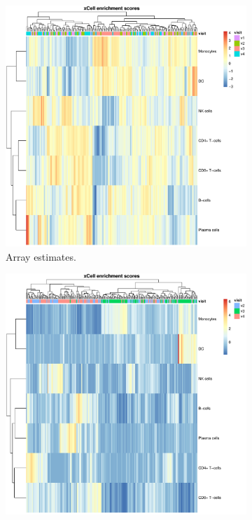 \begin{figure}
    \centering
    \begin{subfigure}[b]{0.6\textwidth}
        \centering
        \includegraphics[width=1.0\textwidth,page=8]{mainmatter/figures/chapter_03/get_xCell_estimates.dataset_array.plots.pdf}
        \caption{Array estimates.}
    \end{subfigure}
    \bigskip\vfill
    \begin{subfigure}[b]{0.6\textwidth}
        \centering
        \includegraphics[width=1.0\textwidth,page=9]{mainmatter/figures/chapter_03/get_xCell_estimates.dataset_rnaseq.plots.pdf}

\end{subfigure}
\end{figure}
